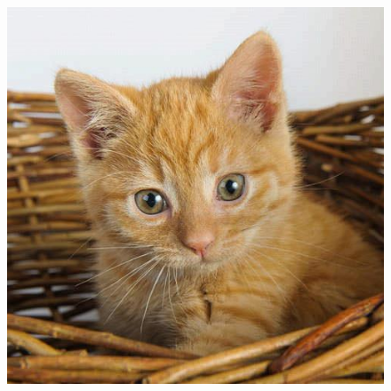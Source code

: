 \begin{figure}
\begin{minipage}{.45\linewidth}
		\label{img2}
	\end{minipage}
		\centering
		\includegraphics[width=.97\textwidth]{sections/pictures/encrypted.jpg}
		\label{img3}
\end{figure} 

